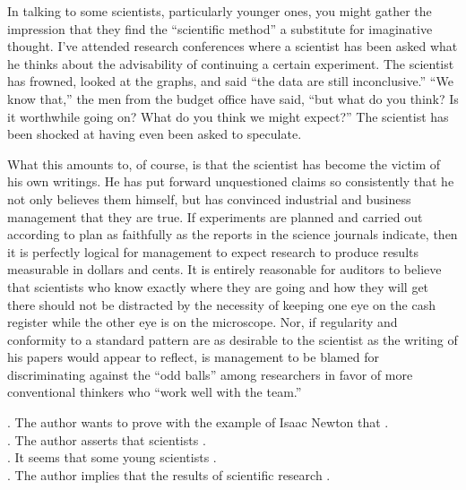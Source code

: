 In talking to some scientists, particularly younger ones, you might gather the impression that they find the “scientific method” a substitute for imaginative thought. I’ve attended research conferences where a scientist has been asked what he thinks about the advisability of continuing a certain experiment. The scientist has frowned, looked at the graphs, and said “the data are still inconclusive.” “We know that,” the men from the budget office have said, “but what do you think? Is it worthwhile going on? What do you think we might expect?” The scientist has been shocked at having even been asked to speculate.

What this amounts to, of course, is that the scientist has become the victim of his own writings. He has put forward unquestioned claims so consistently that he not only believes them himself, but has convinced industrial and business management that they are true. If experiments are planned and carried out according to plan as faithfully as the reports in the science journals indicate, then it is perfectly logical for management to expect research to produce results measurable in dollars and cents. It is entirely reasonable for auditors to believe that scientists who know exactly where they are going and how they will get there should not be distracted by the necessity of keeping one eye on the cash register while the other eye is on the microscope. Nor, if regularity and conformity to a standard pattern are as desirable to the scientist as the writing of his papers would appear to reflect, is management to be blamed for discriminating against the “odd balls” among researchers in favor of more conventional thinkers who “work well with the team.”
\begin{questions}    .	The author wants to prove with the example of Isaac Newton that \ltk{}.\\
    .	The author asserts that scientists \ltk{}.\\
    .	It seems that some young scientists \ltk{}.\\
    .	The author implies that the results of scientific research \ltk{}.\\
\end{questions}
